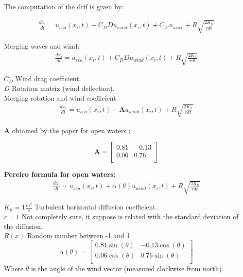 \documentclass[a4paper,12pt]{article}
\begin{document}
\small
The computation of the drif is given by:

\begin{equation}
\begin{split}
\frac{dx_i}{dt} = u_{sea}(x_i, t) + C_D D u_{wind}(x_i,t) + C_W u_{wave} + R \sqrt{\frac{2K_h}{r dt}} 
\end{split}
\end{equation}

Merging waves and wind: \\
\begin{equation}
\begin{split}
\frac{dx_i}{dt} = u_{sea}(x_i, t) + C_D D u_{wind}(x_i,t) + R \sqrt{\frac{2K_h}{r dt}} 
\end{split}
\end{equation}

$C_D$ Wind drag coefficient. \\
$D$ Rotation matrix (wind deflection).\\

Merging rotation and wind coefficient
\begin{equation}
\begin{split}
\frac{dx_i}{dt} = u_{sea}(x_i, t) + \pmb{A}u_{wind}(x_i,t) + R \sqrt{\frac{2K_h}{r dt}} 
\end{split}
\end{equation}

$\pmb{A}$ obtained by the paper for open waters : 

\begin{equation}
\pmb{A} = 
    \begin{bmatrix}
        0.81 & -0.13 \\
        0.06 & 0.76 \\
    \end{bmatrix}
\end{equation}

\textbf{Pereiro formula for open waters:}
\begin{equation}
\begin{split}
\frac{dx_i}{dt} = u_{sea}(x_i, t) + \alpha(\theta) u_{wind}(x_i,t) + R \sqrt{\frac{2K_h}{r dt}} 
\end{split}
\end{equation}

$K_h  = 1 \frac{m^2}{s}$ Turbulent horizontal diffusion coefficient. \\
$r  = 1$ Not completely sure, it suppose is related with the standard deviation of the diffusion. \\
$R(x)$ Random number between -1 and 1 \\
\begin{equation}
\alpha(\theta)
 = 
    \begin{bmatrix}
        0.81 \sin(\theta) & -0.13\cos(\theta) \\
        0.06 \cos(\theta) & 0.76 \sin(\theta) \\
    \end{bmatrix}
\end{equation}
Where $\theta$ is the angle of the wind vector (measured clockwise from north).\\
\end{document}
